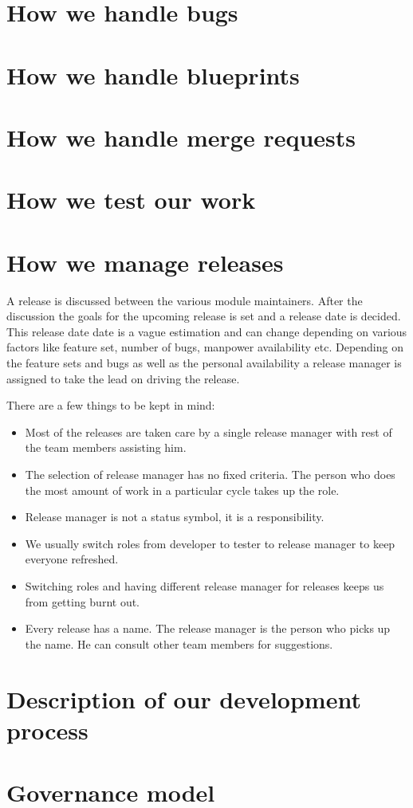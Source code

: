 \section{How we handle bugs}
\section{How we handle blueprints}
\section{How we handle merge requests}
\section{How we test our work}
\section{How we manage releases}
A release is discussed between the various module maintainers. 
After the discussion the goals for the upcoming release is set 
and a release date is decided. This release date date is a vague 
estimation and can change depending on various factors like 
feature set, number of bugs, manpower availability etc. 
Depending on the feature sets and bugs as well as the personal 
availability a release manager is assigned to take the lead 
on driving the release.

There are a few things to be kept in mind:
\begin{itemize}
\item Most of the releases are taken care by a single release manager 
with rest of the team members assisting him. 
\item The selection of release manager has no fixed criteria. The 
person who does the most amount of work in a particular cycle takes 
up the role.
\item Release manager is not a status symbol, it is a responsibility.
\item We usually switch roles from developer to tester to 
release manager to keep everyone refreshed.
\item Switching roles and having different release manager for releases 
keeps us from getting burnt out.
\item Every release has a name. The release manager is the person who 
picks up the name. He can consult other team members for suggestions.
\end{itemize}

\section{Description of our development process}
\section{Governance model}